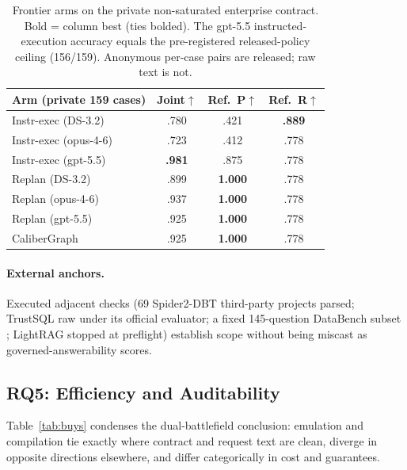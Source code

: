 \documentclass[letterpaper]{article}
\begin{document}
\begin{table}[t]
\centering
\small
\begin{tabular}{lccc}
\toprule
Arm (private 159 cases) & Joint$\uparrow$ & Ref.\ P$\uparrow$ & Ref.\ R$\uparrow$ \\
\midrule
Instr-exec (DS-3.2) & .780 & .421 & \textbf{.889} \\
Instr-exec (opus-4-6) & .723 & .412 & .778 \\
Instr-exec (gpt-5.5) & \textbf{.981} & .875 & .778 \\
Replan (DS-3.2) & .899 & \textbf{1.000} & .778 \\
Replan (opus-4-6) & .937 & \textbf{1.000} & .778 \\
Replan (gpt-5.5) & .925 & \textbf{1.000} & .778 \\
CaliberGraph & .925 & \textbf{1.000} & .778 \\
\bottomrule
\end{tabular}
\caption{Frontier arms on the private non-saturated enterprise contract. Bold = column best (ties bolded). The gpt-5.5 instructed-execution accuracy equals the pre-registered released-policy ceiling (156/159). Anonymous per-case pairs are released; raw text is not.}
\label{tab:privatearms}
\end{table}

\paragraph{External anchors.}
Executed adjacent checks (69 Spider2-DBT third-party projects parsed; TrustSQL raw under its official evaluator; a fixed 145-question DataBench subset \citep{databench2024}; LightRAG \citep{lightrag2026} stopped at preflight) establish scope without being miscast as governed-answerability scores.

\subsection{RQ5: Efficiency and Auditability}

Table~\ref{tab:buys} condenses the dual-battlefield conclusion: emulation and compilation tie exactly where contract and request text are clean, diverge in opposite directions elsewhere, and differ categorically in cost and guarantees.
\end{document}
